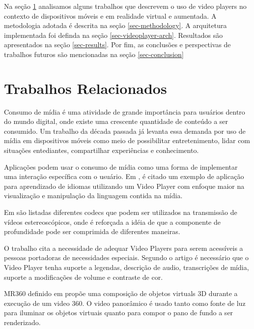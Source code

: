 \documentclass[sigconf]{acmart}
\begin{document}
Na seção \ref{sec-relatedworks} analisamos alguns trabalhos que descrevem o uso de video players no contexto de dispositivos móveis e em realidade virtual e aumentada. A metodologia adotada é descrita na seção \ref{sec-methodology}. A arquitetura implementada foi definda na seção \ref{sec-videoplayer-arch}. Resultados são apresentados na seção \ref{sec-results}. Por fim, as conclusões e perspectivas de trabalhos futuros são mencionadas na seção \ref{sec-conclusion}

\section{Trabalhos Relacionados} \label{sec-relatedworks}

Consumo de mídia é uma atividade de grande importância para usuários dentro do mundo digital, onde existe uma crescente quantidade de conteúdo a ser consumido. Um trabalho \cite{repo2004users} da década passada já levanta essa demanda por uso de mídia em dispositivos móveis como meio de possibilitar entretenimento, lidar com situações entediantes, compartilhar experiências e conhecimento.

Aplicações podem usar o consumo de mídia como uma forma de implementar uma interação específica com o usuário. Em \cite{hu2018kalgan}, é citado um exemplo de aplicação para aprendizado de idiomas utilizando um Video Player com enfoque maior na visualização e manipulação da linguagem contida na mídia.

Em \cite{smolic2009overview} são listadas diferentes codecs que podem ser utilizados na transmissão de vídeos estereoscópicos, onde é reforçada a idéia de que a componente de profundidade pode ser comprimida de diferentes maneiras.


O trabalho \cite{wild2018inaccessibility} cita a necessidade de adequar Video Players para serem acessíveis a pessoas portadoras de necessidades especiais. Segundo o artigo é necessário que o Video Player tenha suporte a legendas, descrição de audio, transcrições de mídia, suporte a modificações de volume e contraste de cor.

MR360 definido em \cite{rhee2017mr360} propõe uma composição de objetos virtuals 3D durante a execução de um video 360. O video panorâmico é usado tanto como fonte de luz para iluminar os objetos virtuais quanto para compor o pano de fundo a ser renderizado.
\end{document}
